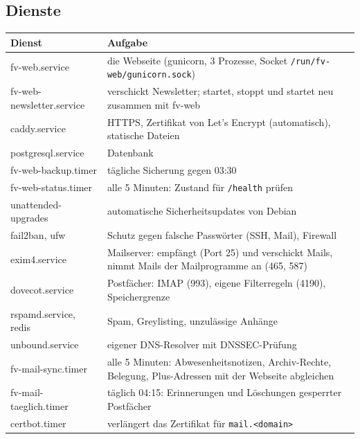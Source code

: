 \documentclass[a4paper,fontsize=10pt]{scrartcl}
\newcommand*{\cmd}[1]{\texttt{#1}}
\newcommand*{\pfad}[1]{\texttt{#1}}
\begin{document}
\subsection{Dienste}

\begin{center}
\small
\begin{tabularx}{\textwidth}{@{}>{\ttfamily}lX@{}}
\toprule
\textbf{\sffamily Dienst} & \textbf{Aufgabe} \\
\midrule
fv-web.service            & die Webseite (gunicorn, 3 Prozesse, Socket \pfad{/run/fv-web/gunicorn.sock}) \\
fv-web-newsletter.service & verschickt Newsletter; startet, stoppt und startet neu zusammen mit fv-web \\
caddy.service             & HTTPS, Zertifikat von Let's Encrypt (automatisch), statische Dateien \\
postgresql.service        & Datenbank \\
fv-web-backup.timer       & tägliche Sicherung gegen 03:30 \\
fv-web-status.timer       & alle 5 Minuten: Zustand für \cmd{/health} prüfen \\
unattended-upgrades       & automatische Sicherheitsupdates von Debian \\
fail2ban, ufw             & Schutz gegen falsche Passwörter (SSH, Mail), Firewall \\
\midrule
exim4.service             & Mailserver: empfängt (Port 25) und verschickt Mails, nimmt Mails der
                            Mailprogramme an (465, 587) \\
dovecot.service           & Postfächer: IMAP (993), eigene Filterregeln (4190), Speichergrenze \\
rspamd.service, redis     & Spam, Greylisting, unzulässige Anhänge \\
unbound.service           & eigener DNS-Resolver mit DNSSEC-Prüfung \\
fv-mail-sync.timer        & alle 5 Minuten: Abwesenheitsnotizen, Archiv-Rechte, Belegung,
                            Plus-Adressen mit der Webseite abgleichen \\
fv-mail-taeglich.timer    & täglich 04:15: Erinnerungen und Löschungen gesperrter Postfächer \\
certbot.timer             & verlängert das Zertifikat für \cmd{mail.<domain>} \\
\bottomrule
\end{tabularx}
\end{center}
\end{document}
